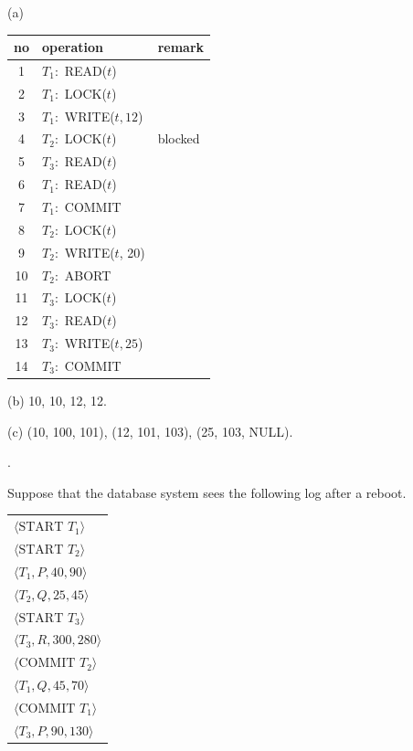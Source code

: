 \begin{sol}
 (a)

\begin{center}
\begin{tabular}{c|l|l}
no & operation & remark \\
\hline
1 & $T_1:$ READ($t$) \\
2 & $T_1:$ LOCK($t$) \\
3 & $T_1:$ WRITE($t, 12$) \\
4 & $T_2:$ LOCK($t$) & blocked \\
5 & $T_3:$ READ($t$) & \\
6 & $T_1:$ READ($t$) \\
7 & $T_1:$ COMMIT \\
8 & $T_2:$ LOCK($t$) & \\
9 & $T_2:$ WRITE($t$, 20) \\
10 & $T_2:$ ABORT \\
11 & $T_3:$ LOCK($t$) & \\
12 & $T_3:$ READ($t$) \\
13 & $T_3:$ WRITE($t, 25$) \\
14 & $T_3:$ COMMIT
\end{tabular}
\end{center}

(b) 10, 10, 12, 12.

(c) (10, 100, 101), (12, 101, 103), (25, 103, NULL).

\end{sol}
\pagebreak
.

\pagebreak

 Suppose that the database system sees the following log after a reboot.

\begin{center}
\begin{tabular}{l}
$\langle \text{START } T_1 \rangle$ \\
$\langle \text{START } T_2 \rangle$ \\
$\langle T_1, P, 40, 90 \rangle$ \\
$\langle T_2, Q, 25, 45 \rangle$ \\
$\langle \text{START } T_3 \rangle$ \\
$\langle T_3, R, 300, 280 \rangle$ \\
$\langle \text{COMMIT } T_2 \rangle$ \\
$\langle T_1, Q, 45, 70 \rangle$ \\
$\langle \text{COMMIT } T_1 \rangle$ \\
$\langle T_3, P, 90, 130 \rangle$
\end{tabular}
\end{center}

